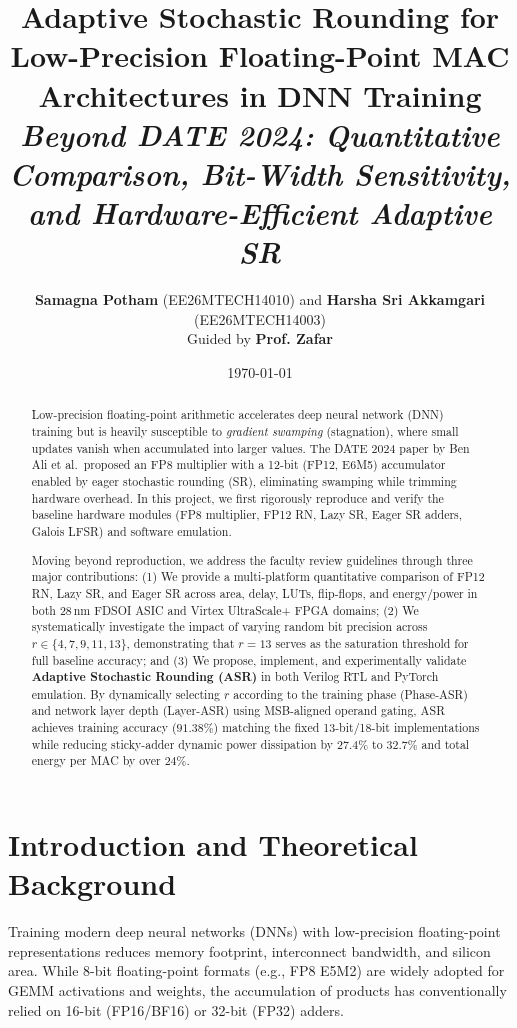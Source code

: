 \documentclass[11pt,a4paper]{article}
\title{\textbf{Adaptive Stochastic Rounding for Low-Precision Floating-Point MAC Architectures in DNN Training}\\
\large\textit{Beyond DATE 2024: Quantitative Comparison, Bit-Width Sensitivity, and Hardware-Efficient Adaptive SR}}
\author{\textbf{Samagna Potham} (EE26MTECH14010) \quad and \quad \textbf{Harsha Sri Akkamgari} (EE26MTECH14003)\\
\large Guided by \textbf{Prof. Zafar}}
\date{\today}
\begin{document}
\maketitle

\begin{abstract}
Low-precision floating-point arithmetic accelerates deep neural network (DNN) training but is heavily susceptible to \textit{gradient swamping} (stagnation), where small updates vanish when accumulated into larger values. The DATE 2024 paper by Ben Ali et al.\ proposed an FP8 multiplier with a 12-bit (FP12, E6M5) accumulator enabled by eager stochastic rounding (SR), eliminating swamping while trimming hardware overhead. In this project, we first rigorously reproduce and verify the baseline hardware modules (FP8 multiplier, FP12 RN, Lazy SR, Eager SR adders, Galois LFSR) and software emulation. 

Moving beyond reproduction, we address the faculty review guidelines through three major contributions: 
(1) We provide a multi-platform quantitative comparison of FP12 RN, Lazy SR, and Eager SR across area, delay, LUTs, flip-flops, and energy/power in both 28\,nm FDSOI ASIC and Virtex UltraScale+ FPGA domains;
(2) We systematically investigate the impact of varying random bit precision across $r \in \{4, 7, 9, 11, 13\}$, demonstrating that $r=13$ serves as the saturation threshold for full baseline accuracy; and
(3) We propose, implement, and experimentally validate \textbf{Adaptive Stochastic Rounding (ASR)} in both Verilog RTL and PyTorch emulation. By dynamically selecting $r$ according to the training phase (Phase-ASR) and network layer depth (Layer-ASR) using MSB-aligned operand gating, ASR achieves training accuracy ($91.38\%$) matching the fixed 13-bit/18-bit implementations while reducing sticky-adder dynamic power dissipation by $27.4\%$ to $32.7\%$ and total energy per MAC by over $24\%$.
\end{abstract}

\tableofcontents
\newpage

\section{Introduction and Theoretical Background}
Training modern deep neural networks (DNNs) with low-precision floating-point representations reduces memory footprint, interconnect bandwidth, and silicon area. While 8-bit floating-point formats (e.g., FP8 E5M2) are widely adopted for GEMM activations and weights, the accumulation of products has conventionally relied on 16-bit (FP16/BF16) or 32-bit (FP32) adders.
\end{document}

